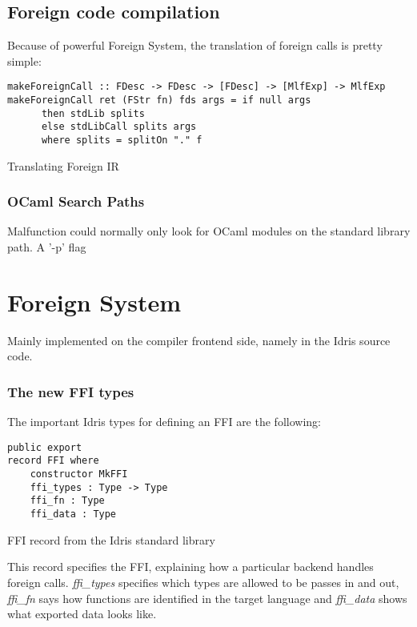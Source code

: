 \subsection{Foreign code compilation}
Because of powerful Foreign System, the translation of foreign
calls is pretty simple:

\begin{listing}[H]
    \begin{verbatim}
makeForeignCall :: FDesc -> FDesc -> [FDesc] -> [MlfExp] -> MlfExp
makeForeignCall ret (FStr fn) fds args = if null args
      then stdLib splits
      else stdLibCall splits args
      where splits = splitOn "." f
    \end{verbatim}
    \caption{Translating Foreign IR}
\end{listing}


\subsubsection{OCaml Search Paths}
Malfunction could normally only look for OCaml modules on the
standard library path. A '-p' flag


\section{Foreign System}
Mainly implemented on the compiler frontend side, namely in the Idris
source code.

\subsubsection{The new FFI types}
The important Idris types for defining an FFI are the following:

\begin{listing}[H]
    \begin{verbatim}
public export
record FFI where
    constructor MkFFI
    ffi_types : Type -> Type
    ffi_fn : Type
    ffi_data : Type
    \end{verbatim}
    \caption{FFI record from the Idris standard library}
\end{listing}

This record specifies the FFI, explaining how a particular backend
handles foreign calls. \emph{ffi\_types} specifies which types
are allowed to be passes in and out, \emph{ffi\_fn} says how
functions are identified in the target language and
\emph{ffi\_data} shows what exported data looks like.

